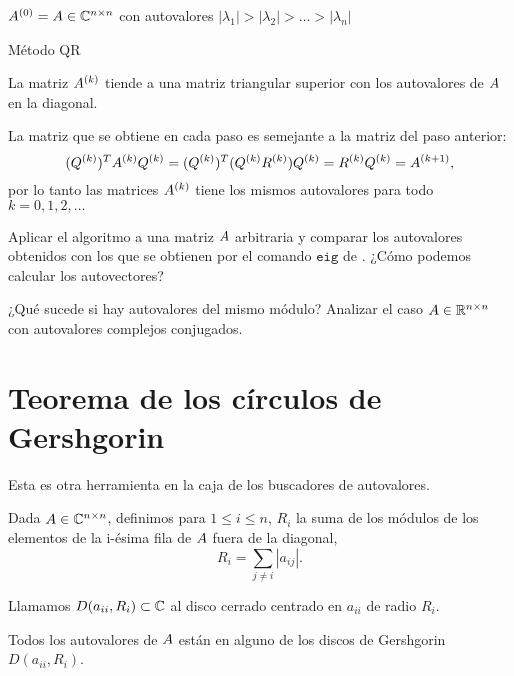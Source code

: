 \begin{algorithm}[H]
\SetAlgoLined
$\Ab^{(0)} = \Ab \in \Cnn$ con autovalores $|\lambda_1| > |\lambda_2| > \dots > |\lambda_n|$\;
 \caption{Método QR}
\end{algorithm}

\begin{prop}
La matriz $\Ab^{(k)}$ tiende a una matriz triangular superior con los autovalores de $\Ab$ en la diagonal.
\end{prop} 

\begin{remark} La matriz que se obtiene en cada paso es semejante a la matriz del paso anterior:
$$
(\Qb^{(k)})^T \Ab^{(k)} \Qb^{(k)} = (\Qb^{(k)})^T (\Qb^{(k)} \Rb^{(k)}) \Qb^{(k)} = \Rb^{(k)} \Qb^{(k)} = \Ab^{(k+1)},
$$
por lo tanto las matrices $\Ab^{(k)}$ tiene los mismos autovalores para todo $k = 0, 1, 2, \dots$
\end{remark}

\begin{ejercicio} Aplicar el algoritmo a una matriz $\Ab$ arbitraria y comparar los autovalores obtenidos con los que se obtienen por el comando $\texttt{eig}$ de \python. ¿Cómo podemos calcular los autovectores?
\end{ejercicio}

\begin{ejercicio}
¿Qué sucede si hay autovalores del mismo módulo? Analizar el caso $\Ab \in \Rnn$ con autovalores complejos conjugados.
\end{ejercicio}


\section{Teorema de los círculos de Gershgorin}

Esta es otra herramienta en la caja de los buscadores de autovalores.

Dada $\Ab \in \Cnn$, definimos para $1 \le i \le n$, $R_i$ la suma de los módulos de los elementos de la i-ésima fila de $\Ab$ fuera de la diagonal,
$$
R_i = \sum_{j \neq i} | a_{ij} |.
$$

Llamamos $D(a_{ii}, R_{i}) \subset \mathbb C$ al disco cerrado centrado en $a_{ii}$ de radio $R_{i}$.

\begin{teo} Todos los autovalores de $\Ab$ están en alguno de los discos de Gershgorin $D(a_{ii}, R_{i})$.
\end{teo}





